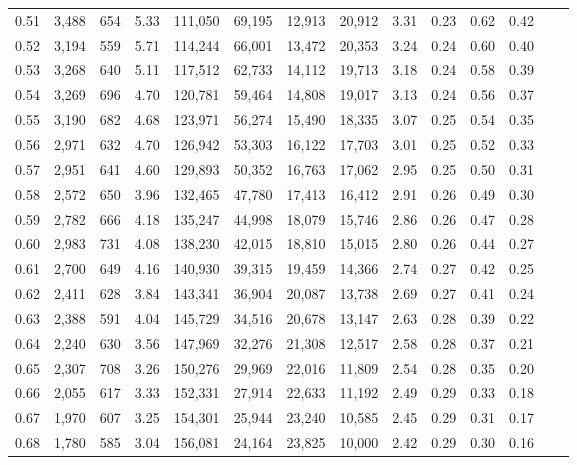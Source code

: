 \begin{tabular}{rrrrrrrrrrrrrr}
0.51 &  3,488 &  654 &    5.33 &  111,050 &   69,195 &  12,913 &  20,912 &  3.31 &  0.23 &  0.62 &      0.42 \\
0.52 &  3,194 &  559 &    5.71 &  114,244 &   66,001 &  13,472 &  20,353 &  3.24 &  0.24 &  0.60 &      0.40 \\
0.53 &  3,268 &  640 &    5.11 &  117,512 &   62,733 &  14,112 &  19,713 &  3.18 &  0.24 &  0.58 &      0.39 \\
0.54 &  3,269 &  696 &    4.70 &  120,781 &   59,464 &  14,808 &  19,017 &  3.13 &  0.24 &  0.56 &      0.37 \\
0.55 &  3,190 &  682 &    4.68 &  123,971 &   56,274 &  15,490 &  18,335 &  3.07 &  0.25 &  0.54 &      0.35 \\
0.56 &  2,971 &  632 &    4.70 &  126,942 &   53,303 &  16,122 &  17,703 &  3.01 &  0.25 &  0.52 &      0.33 \\
0.57 &  2,951 &  641 &    4.60 &  129,893 &   50,352 &  16,763 &  17,062 &  2.95 &  0.25 &  0.50 &      0.31 \\
0.58 &  2,572 &  650 &    3.96 &  132,465 &   47,780 &  17,413 &  16,412 &  2.91 &  0.26 &  0.49 &      0.30 \\
0.59 &  2,782 &  666 &    4.18 &  135,247 &   44,998 &  18,079 &  15,746 &  2.86 &  0.26 &  0.47 &      0.28 \\
0.60 &  2,983 &  731 &    4.08 &  138,230 &   42,015 &  18,810 &  15,015 &  2.80 &  0.26 &  0.44 &      0.27 \\
0.61 &  2,700 &  649 &    4.16 &  140,930 &   39,315 &  19,459 &  14,366 &  2.74 &  0.27 &  0.42 &      0.25 \\
0.62 &  2,411 &  628 &    3.84 &  143,341 &   36,904 &  20,087 &  13,738 &  2.69 &  0.27 &  0.41 &      0.24 \\
0.63 &  2,388 &  591 &    4.04 &  145,729 &   34,516 &  20,678 &  13,147 &  2.63 &  0.28 &  0.39 &      0.22 \\
0.64 &  2,240 &  630 &    3.56 &  147,969 &   32,276 &  21,308 &  12,517 &  2.58 &  0.28 &  0.37 &      0.21 \\
0.65 &  2,307 &  708 &    3.26 &  150,276 &   29,969 &  22,016 &  11,809 &  2.54 &  0.28 &  0.35 &      0.20 \\
0.66 &  2,055 &  617 &    3.33 &  152,331 &   27,914 &  22,633 &  11,192 &  2.49 &  0.29 &  0.33 &      0.18 \\
0.67 &  1,970 &  607 &    3.25 &  154,301 &   25,944 &  23,240 &  10,585 &  2.45 &  0.29 &  0.31 &      0.17 \\
0.68 &  1,780 &  585 &    3.04 &  156,081 &   24,164 &  23,825 &  10,000 &  2.42 &  0.29 &  0.30 &      0.16 \\

\end{tabular}
